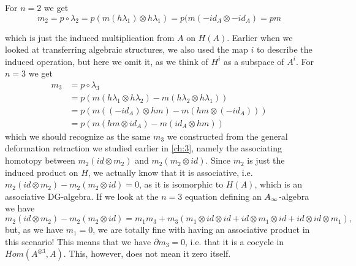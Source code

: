 

For $n=2$ we get
\begin{equation*}
    m_2 = p\circ \lambda_2 = p(m(h\lambda_1)\otimes h\lambda_1) = p(m(-id_A\otimes -id_A) = pm
\end{equation*}

which is just the induced multiplication from $A$ on $H(A)$. Earlier when we looked at transferring algebraic structures, we also used the map $i$ to describe the induced operation, but here we omit it, as we think of $H^i$ as a subspace of $A^i$. For $n=3$ we get 
\begin{align*}
    m_3 
    &= p\circ \lambda_3 \\
    &= p(m(h\lambda_1\otimes h\lambda_2)-m(h\lambda_2\otimes h\lambda_1)) \\
    &= p(m((-id_A)\otimes hm)-m(hm\otimes (-id_A))) \\
    &= p(m(hm\otimes id_A)-m(id_A\otimes hm))
\end{align*}
which we should recognize as the same $m_3$ we constructed from the general deformation retraction we studied earlier in \cref{ch:3}, namely the associating homotopy between $m_2(id\otimes m_2)$ and $m_2(m_2\otimes id)$. Since $m_2$ is just the induced product on $H$, we actually know that it is associative, i.e. $m_2(id\otimes m_2)-m_2(m_2\otimes id)=0$, as it is isomorphic to $H(A)$, which is an associative DG-algebra. If we look at the $n=3$ equation defining an $A_{\infty}$-algebra we have 
\begin{equation*}
    m_2(id\otimes m_2)-m_2(m_2\otimes id) = m_1 m_3 + m_3(m_1\otimes id\otimes id + id\otimes m_1\otimes id + id\otimes id \otimes m_1), 
\end{equation*}
but, as we have $m_1=0$, we are totally fine with having an associative product in this scenario! This means that we have $\partial m_3 = 0$, i.e. that it is a cocycle in $Hom(A^{\otimes 3}, A)$. This, however, does not mean it zero itself.

